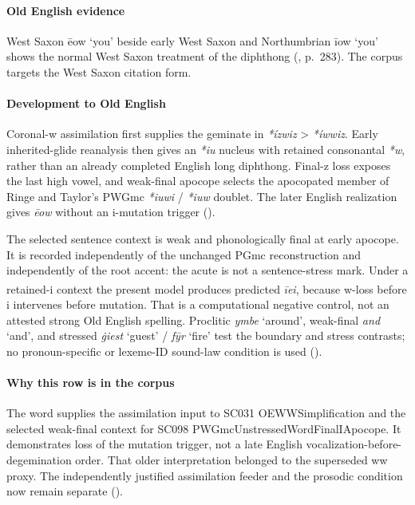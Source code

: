 \documentclass[
  british,
  a4paper,
]{article}
\providecommand{\Pred}[1]{\textsuperscript{\dag}\emph{#1}}
\begin{document}
\paragraph{Old English evidence}\label{old-english-evidence-86}

West Saxon {ēow} `you' beside early West Saxon and Northumbrian {īow}
`you' shows the normal West Saxon treatment of the diphthong
(, p.~283). The
corpus targets the West Saxon citation form.

\paragraph{Development to Old
English}\label{development-to-old-english-84}

Coronal-w assimilation first supplies the geminate in \emph{*ízwiz}
\textgreater{} \emph{*íwwiz}. Early inherited-glide reanalysis then
gives an \emph{*iu} nucleus with retained consonantal \emph{*w}, rather
than an already completed English long diphthong. Final-z loss exposes
the last high vowel, and weak-final apocope selects the apocopated
member of Ringe and Taylor's PWGmc \emph{*iuwi} / \emph{*iuw} doublet.
The later English realization gives \emph{ēow} without an i-mutation
trigger ().

The selected sentence context is weak and phonologically final at early
apocope. It is recorded independently of the unchanged PGmc
reconstruction and independently of the root accent: the acute is not a
sentence-stress mark. Under a retained-i context the present model
produces predicted \Pred{īei}, because w-loss before i intervenes before
mutation. That is a computational negative control, not an attested
strong Old English spelling. Proclitic \emph{ymbe} `around', weak-final
\emph{and} `and', and stressed \emph{ġiest} `guest' / \emph{fȳr} `fire'
test the boundary and stress contrasts; no pronoun-specific or lexeme-ID
sound-law condition is used ().

\paragraph{Why this row is in the
corpus}\label{why-this-row-is-in-the-corpus-3}

The word supplies the assimilation input to SC031 OEWWSimplification and
the selected weak-final context for SC098
PWGmcUnstressedWordFinalIApocope. It demonstrates loss of the mutation
trigger, not a late English vocalization-before-degemination order. That
older interpretation belonged to the superseded ww proxy. The
independently justified assimilation feeder and the prosodic condition
now remain separate ().
\end{document}
